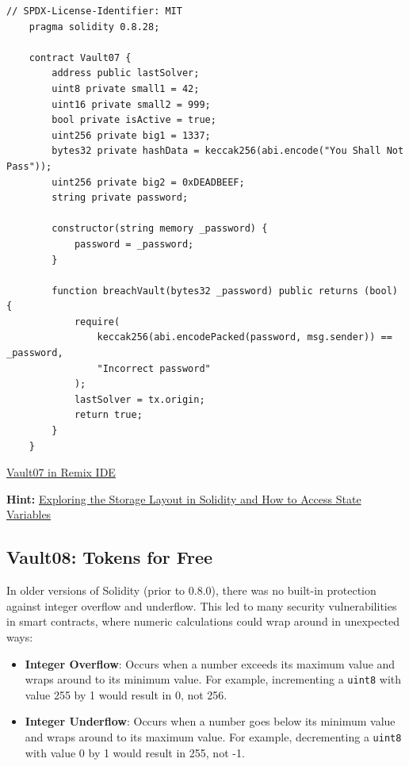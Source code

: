\documentclass[12pt]{article}
\begin{document}
\noindent
\begin{minipage}{\textwidth}
    \begin{lstlisting}[language=Solidity]
    // SPDX-License-Identifier: MIT
    pragma solidity 0.8.28;
    
    contract Vault07 {
        address public lastSolver;
        uint8 private small1 = 42;
        uint16 private small2 = 999;
        bool private isActive = true;
        uint256 private big1 = 1337;
        bytes32 private hashData = keccak256(abi.encode("You Shall Not Pass"));
        uint256 private big2 = 0xDEADBEEF;
        string private password;
    
        constructor(string memory _password) {
            password = _password;
        }
    
        function breachVault(bytes32 _password) public returns (bool) {
            require(
                keccak256(abi.encodePacked(password, msg.sender)) == _password,
                "Incorrect password"
            );
            lastSolver = tx.origin;
            return true;
        }
    }
\end{lstlisting}
\end{minipage}

\medskip
\noindent
\href{https://remix.ethereum.org/?#activate=solidity&url=https://github.com/radovluk/unbreakable-vault/contracts/Vault07.sol&lang=en&optimize=false&runs=200&evmVersion=null&version=soljson-v0.8.28+commit.7893614a.js}{Vault07 in Remix IDE}

\medskip
\noindent
\textbf{Hint:} \href{https://medium.com/@flores.eugenio03/exploring-the-storage-layout-in-solidity-and-how-to-access-state-variables-bf2cbc6f8018}{Exploring the Storage Layout in Solidity and How to Access State Variables}

\subsection*{Vault08: Tokens for Free}

In older versions of Solidity (prior to 0.8.0), there was no built-in
protection against integer overflow and underflow. This led to many security
vulnerabilities in smart contracts, where numeric calculations could wrap
around in unexpected ways:

\begin{itemize}
    \item \textbf{Integer Overflow}: Occurs when a number exceeds its maximum value and wraps around to its minimum value. For example, incrementing a \texttt{uint8} with value 255 by 1 would result in 0, not 256.
    \item \textbf{Integer Underflow}: Occurs when a number goes below its minimum value and wraps around to its maximum value. For example, decrementing a \texttt{uint8} with value 0 by 1 would result in 255, not -1.
\end{itemize}
\end{document}
